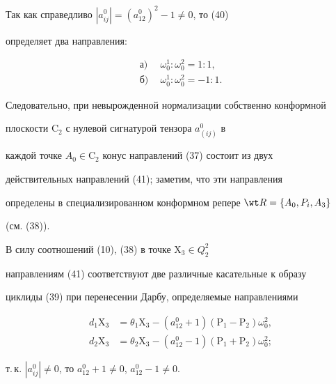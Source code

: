 Так как справедливо $|a^0_{i j}|=(a^0_{12})^2-1\ne0$, то (40) 


определяет два направления: 


\begin{equation} 


\begin{split} 


\text{а)}\ \ &\omega^1_0:\omega^2_0=1:1, \\ 


\text{б)}\ \ &\omega^1_0:\omega^2_0=-1:1. 


\end{split} 


\end{equation} 


Следовательно, при невырожденной нормализации собственно конформной 


плоскости $\mathrm C_2$ с нулевой сигнатурой тензора $a^0_{(i j)}$ в 


каждой точке $A_0\in\mathrm C_2$ конус направлений (37) состоит из двух 


действительных направлений (41); заметим, что эти направления 


определены в специализированном конформном репере $\wt R=\{A_0,P_i,A_3\}$


(см. (38)). 


 


В силу соотношений (10), (38) в точке $\mathrm X_3\in Q^2_2$ 


направлениям (41) соответствуют две различные касательные к образу 


циклиды (39) при перенесении Дарбу, определяемые направлениями 


\begin{equation} 


\begin{split} 


d_1\mathrm X_3&=\theta_1\mathrm X_3-(a^0_{12}+1) 


(\mathrm P_1-\mathrm P_2)\omega^2_0, \\ 


d_2\mathrm X_3&=\theta_2\mathrm X_3-(a^0_{12}-1) 


(\mathrm P_1+\mathrm P_2)\omega^2_0; 


\end{split} 


\end{equation} 


т.\,к. $|a^0_{i j}|\ne0$, то $a^0_{12}+1\ne0$, $a^0_{12}-1\ne0$. 


